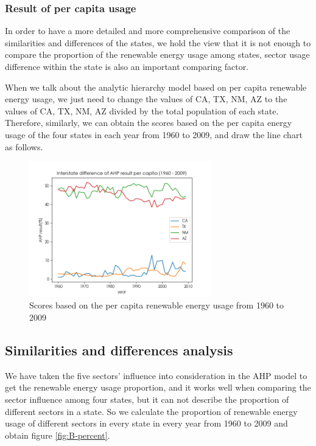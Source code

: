 \documentclass[a4paper,11pt]{article}
\begin{document}
\subsubsection{Result of per capita usage}
\par In order to have a more detailed and more comprehensive comparison of the similarities and differences of the states, we hold the view that it is not enough to compare the proportion of the renewable energy usage among states, sector usage difference within the state is also an important comparing factor.
\par When we talk about the analytic hierarchy model based on per capita renewable energy usage, we just need to change the values of CA, TX, NM, AZ to the values of CA, TX, NM, AZ divided by the total population of each state. Therefore, similarly, we can obtain the scores based on the per capita energy usage of the four states in each year from 1960 to 2009, and draw the line chart as follows.
\begin{figure}[H] 
    \centering 
    \includegraphics[width=0.7\textwidth]{./Pic/B-level-percapita.png}
    \caption{Scores based on the per capita renewable energy usage from 1960 to 2009}
    \label{fig:B-level-percapita}
\end{figure}

\subsection{Similarities and differences analysis}



\par We have taken the five sectors' influence into consideration in the AHP model to get the renewable energy usage proportion, and it works well when comparing the sector influence among four states, but it can not describe the proportion of different sectors in a state. So we calculate the proportion of renewable energy usage of different sectors in every state in every year from 1960 to 2009 and obtain figure \ref{fig:B-percent}.
\end{document}
